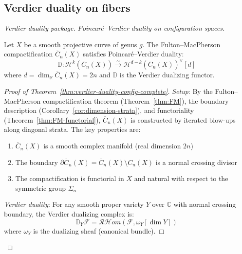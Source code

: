 \subsection{Verdier duality on fibers}

\begin{proof}[Verdier duality package]

\emph{Poincaré--Verdier duality on configuration spaces.}

\begin{theorem}
\label{thm:verdier-duality-config-complete}
Let $X$ be a smooth projective curve of genus $g$. The Fulton--MacPherson
compactification $\overline{C}_n(X)$ satisfies Poincaré--Verdier duality:
\begin{equation}
\mathbb{D}: \mathcal{H}^k(\overline{C}_n(X)) \xrightarrow{\sim} \mathcal{H}^{d-k}(
\overline{C}_n(X))^\vee[d]
\end{equation}
where $d = \dim_{\mathbb{R}} \overline{C}_n(X) = 2n$ and $\mathbb{D}$ is the Verdier
dualizing functor.
\end{theorem}

\begin{proof}[Proof of Theorem~\ref{thm:verdier-duality-config-complete}]
\emph{Setup}: By the Fulton--MacPherson compactification theorem
\textup{(}Theorem~\textup{\ref{thm:FM}}\textup{)}, the boundary
description
\textup{(}Corollary~\textup{\ref{cor:dimension-strata}}\textup{)}, and
functoriality
\textup{(}Theorem~\textup{\ref{thm:FM-functorial}}\textup{)},
$\overline{C}_n(X)$ is constructed by iterated blow-ups along diagonal
strata. The key properties are:
\begin{enumerate}
\item $\overline{C}_n(X)$ is a smooth complex manifold (real dimension $2n$)
\item The boundary $\partial \overline{C}_n(X) = \overline{C}_n(X) \setminus C_n(X)$
is a normal crossing divisor
\item The compactification is functorial in $X$ and natural with respect to the
symmetric group $\Sigma_n$
\end{enumerate}

\emph{Verdier duality}: For any smooth proper variety $Y$ over $\mathbb{C}$ with
normal crossing boundary, the Verdier dualizing complex is:
\begin{equation}
\mathbb{D}_Y \mathcal{F} = \mathcal{RH}om(\mathcal{F}, \omega_Y[\dim Y])
\end{equation}
where $\omega_Y$ is the dualizing sheaf (canonical bundle).


\end{proof}
\end{proof}
